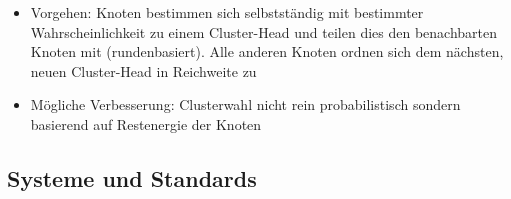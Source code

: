 \begin{itemize}
\begin{itemize}
\begin{itemize}
\begin{itemize}
			\end{itemize}
			\item Vorgehen: Knoten bestimmen sich selbstständig mit bestimmter Wahrscheinlichkeit zu einem Cluster-Head und teilen dies den benachbarten Knoten mit (rundenbasiert). Alle anderen Knoten ordnen sich dem nächsten, neuen Cluster-Head in Reichweite zu
			\item Mögliche Verbesserung: Clusterwahl nicht rein probabilistisch sondern basierend auf Restenergie der Knoten
		\end{itemize}
	\end{itemize}
\end{itemize}


\subsection{Systeme und Standards}

